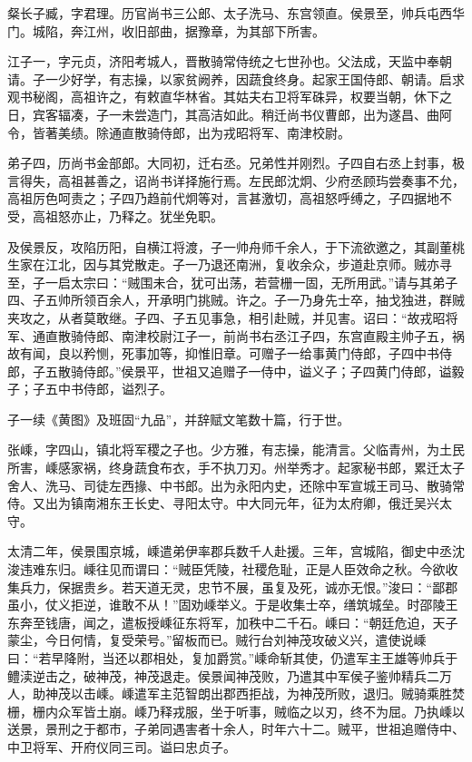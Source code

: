 \documentclass[12pt,UTF8]{ctexbook}
\begin{document}
粲长子臧，字君理。历官尚书三公郎、太子洗马、东宫领直。侯景至，帅兵屯西华门。城陷，奔江州，收旧部曲，据豫章，为其部下所害。

江子一，字元贞，济阳考城人，晋散骑常侍统之七世孙也。父法成，天监中奉朝请。子一少好学，有志操，以家贫阙养，因蔬食终身。起家王国侍郎、朝请。启求观书秘阁，高祖许之，有敕直华林省。其姑夫右卫将军硃异，权要当朝，休下之日，宾客辐凑，子一未尝造门，其高洁如此。稍迁尚书仪曹郎，出为遂昌、曲阿令，皆著美绩。除通直散骑侍郎，出为戎昭将军、南津校尉。

弟子四，历尚书金部郎。大同初，迁右丞。兄弟性并刚烈。子四自右丞上封事，极言得失，高祖甚善之，诏尚书详择施行焉。左民郎沈炯、少府丞顾玙尝奏事不允，高祖厉色呵责之；子四乃趋前代炯等对，言甚激切，高祖怒呼缚之，子四据地不受，高祖怒亦止，乃释之。犹坐免职。

及侯景反，攻陷历阳，自横江将渡，子一帅舟师千余人，于下流欲邀之，其副董桃生家在江北，因与其党散走。子一乃退还南洲，复收余众，步道赴京师。贼亦寻至，子一启太宗曰：“贼围未合，犹可出荡，若营栅一固，无所用武。”请与其弟子四、子五帅所领百余人，开承明门挑贼。许之。子一乃身先士卒，抽戈独进，群贼夹攻之，从者莫敢继。子四、子五见事急，相引赴贼，并见害。诏曰：“故戎昭将军、通直散骑侍郎、南津校尉江子一，前尚书右丞江子四，东宫直殿主帅子五，祸故有闻，良以矜恻，死事加等，抑惟旧章。可赠子一给事黄门侍郎，子四中书侍郎，子五散骑侍郎。”侯景平，世祖又追赠子一侍中，谥义子；子四黄门侍郎，谥毅子；子五中书侍郎，谥烈子。

子一续《黄图》及班固“九品”，并辞赋文笔数十篇，行于世。

张嵊，字四山，镇北将军稷之子也。少方雅，有志操，能清言。父临青州，为土民所害，嵊感家祸，终身蔬食布衣，手不执刀刃。州举秀才。起家秘书郎，累迁太子舍人、洗马、司徒左西掾、中书郎。出为永阳内史，还除中军宣城王司马、散骑常侍。又出为镇南湘东王长史、寻阳太守。中大同元年，征为太府卿，俄迁吴兴太守。

太清二年，侯景围京城，嵊遣弟伊率郡兵数千人赴援。三年，宫城陷，御史中丞沈浚违难东归。嵊往见而谓曰：“贼臣凭陵，社稷危耻，正是人臣效命之秋。今欲收集兵力，保据贵乡。若天道无灵，忠节不展，虽复及死，诚亦无恨。”浚曰：“鄙郡虽小，仗义拒逆，谁敢不从！”固劝嵊举义。于是收集士卒，缮筑城垒。时邵陵王东奔至钱唐，闻之，遣板授嵊征东将军，加秩中二千石。嵊曰：“朝廷危迫，天子蒙尘，今日何情，复受荣号。”留板而已。贼行台刘神茂攻破义兴，遣使说嵊曰：“若早降附，当还以郡相处，复加爵赏。”嵊命斩其使，仍遣军主王雄等帅兵于鳢渎逆击之，破神茂，神茂退走。侯景闻神茂败，乃遣其中军侯子鉴帅精兵二万人，助神茂以击嵊。嵊遣军主范智朗出郡西拒战，为神茂所败，退归。贼骑乘胜焚栅，栅内众军皆土崩。嵊乃释戎服，坐于听事，贼临之以刃，终不为屈。乃执嵊以送景，景刑之于都市，子弟同遇害者十余人，时年六十二。贼平，世祖追赠侍中、中卫将军、开府仪同三司。谥曰忠贞子。
\end{document}
